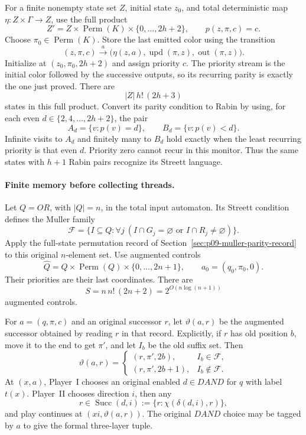 For a finite nonempty state
set \(Z\), initial state
\(z_0\), and total deterministic
map \(\eta:Z\times\Gamma\to Z\),
use the full product
\[
 Z'=Z\times\operatorname{Perm}(K)\times\{0,\ldots,2h+2\},
 \qquad p(z,\pi,c)=c.
\]
Choose \(\pi_0\in\operatorname{Perm}(K)\).
Store the last emitted color
using the transition
\[
 (z,\pi,c)\xrightarrow{a}
 \bigl(\eta(z,a),\operatorname{upd}(\pi,z),
                         \operatorname{out}(\pi,z)\bigr).
\]
Initialize at
\((z_0,\pi_0,2h+2)\)
and assign priority \(c\).
The priority stream is
the initial color followed
by the successive outputs,
so its recurring parity
is exactly the one
just proved.
There are
\[
 |Z|\,h!\,(2h+3)
\]
states in this full
product.
Convert its parity
condition to Rabin by
using, for each even
\(d\in\{2,4,\ldots,2h+2\}\),
the pair
\[
 A_d=\{v:p(v)=d\},\qquad
 B_d=\{v:p(v)<d\}.
\]
Infinite visits to
\(A_d\) and finitely
many to \(B_d\)
hold exactly when the
least recurring priority
is that even \(d\).
Priority zero cannot
recur in this monitor.
Thus the same states
with \(h+1\) Rabin
pairs recognize its
Streett language.

\paragraph{Finite memory before collecting threads.}
Let \(Q=OR\), with
\(|Q|=n\), in the
total input automaton.
Its Streett condition
defines the Muller
family
\[
 \mathcal F=\{I\subseteq Q:
    \forall j\ (I\cap G_j=\varnothing
                         \text{ or }I\cap R_j\ne\varnothing)\}.
\]
Apply the full-state
permutation record of
Section~\ref{sec:p09-muller-parity-record}
to this original
\(n\)-element set.
Use augmented controls
\[
 \widehat Q=
 Q\times\operatorname{Perm}(Q)\times\{0,\ldots,2n+1\},
 \qquad
 a_0=(q_0,\pi_0,0).
\]
Their priorities are
their last coordinates.
There are
\[
 S=n\,n!\,(2n+2)
     =2^{O(n\log(n+1))}
\]
augmented controls.

For \(a=(q,\pi,c)\)
and an original successor
\(r\), let \(\vartheta(a,r)\)
be the augmented successor
obtained by reading \(r\)
in that record.
Explicitly, if \(r\)
has old position \(b\),
move it to the end
to get \(\pi'\), and
let \(I_b\) be the
old suffix set. Then
\[
 \vartheta(a,r)=
 \begin{cases}
  (r,\pi',2b),&I_b\in\mathcal F,\\
  (r,\pi',2b+1),&I_b\notin\mathcal F.
 \end{cases}
\]
At \((x,a)\), Player~I
chooses an original enabled
\(d\in DAND\) for \(q\)
with label \(t(x)\).
Player~II chooses direction
\(i\), then any
\[
 r\in\operatorname{Succ}(d,i)
       :=\{r:\chi(\delta(d,i),r)\},
\]
and play continues at
\((xi,\vartheta(a,r))\).
The original \(DAND\)
choice may be tagged
by \(a\) to give
the formal three-layer
tuple.

